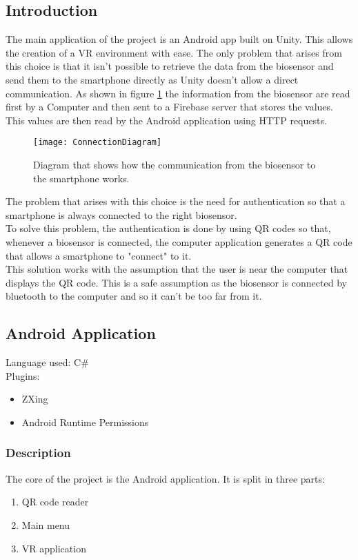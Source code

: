\subsection{Introduction}
The main application of the project is an Android app built on Unity. This allows the creation of a VR environment with ease. The only problem that arises from this choice is that it isn't possible to retrieve the data from the biosensor and send them to the smartphone directly as Unity doesn't allow a direct communication. As shown in figure \ref{fig:communication} the information from the biosensor are read first by a Computer and then sent to a Firebase server that stores the values. This values are then read by the Android application using HTTP requests.
\begin{figure}[H]
	\centering
	\texttt{[image: ConnectionDiagram]}
	\caption{Diagram that shows how the communication from the biosensor to the smartphone works.}\label{fig:communication}
\end{figure}
The problem that arises with this choice is the need for authentication so that a smartphone is always connected to the right biosensor.\\
To solve this problem, the authentication is done by using QR codes so that, whenever a biosensor is connected, the computer application generates a QR code that allows a smartphone to "connect" to it.\\
This solution works with the assumption that the user is near the computer that displays the QR code. This is a safe assumption as the biosensor is connected by bluetooth to the computer and so it can't be too far from it.
\subsection{Android Application}
Language used: C\#\\
Plugins:
\begin{itemize}
	\item ZXing
	\item Android Runtime Permissions
\end{itemize}

\subsubsection{Description}
The core of the project is the Android application. It is split in three parts:
\begin{enumerate}
	\item QR code reader
	\item Main menu
	\item VR application
\end{enumerate}

